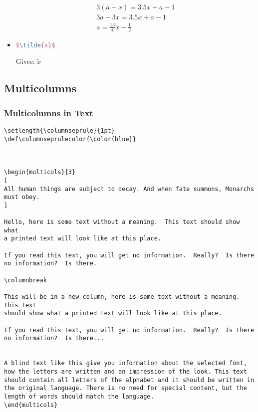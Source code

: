 \begin{itemize}
    \begin{equation}
        \begin{aligned}
            3(a-x) = 3.5x + a - 1           \\
            3a - 3x = 3.5x + a -1           \\
            a = \frac{13}{4}x - \frac{1}{2} 
        \end{aligned}
    \end{equation}

    \item {}
    \begin{lstlisting}[language=TeX]
        $\tilde{x}$        
    \end{lstlisting}
    Gives: $\tilde{x}$
\end{itemize}






\subsection{Multicolumns}

\subsubsection{Multicolumns in Text}

\begin{lstlisting}[language=Tex]
\setlength{\columnseprule}{1pt}
\def\columnseprulecolor{\color{blue}}
 

 
\begin{multicols}{3}
[
All human things are subject to decay. And when fate summons, Monarchs must obey.
]
 
Hello, here is some text without a meaning.  This text should show what 
a printed text will look like at this place.
 
If you read this text, you will get no information.  Really?  Is there 
no information?  Is there.
 
\columnbreak
 
This will be in a new column, here is some text without a meaning.  This text 
should show what a printed text will look like at this place.
 
If you read this text, you will get no information.  Really?  Is there 
no information?  Is there...


A blind text like this give you information about the selected font, how the letters are written and an impression of the look. This text should contain all letters of the alphabet and it should be written in the original language. There is no need for special content, but the length of words should match the language.
\end{multicols}
\end{lstlisting}

